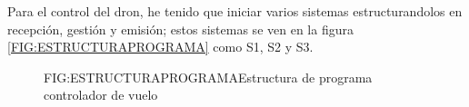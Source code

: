 
Para el control del dron, he tenido que iniciar varios sistemas estructurandolos en recepción, gestión y emisión; estos sistemas se ven en la figura \ref{FIG:ESTRUCTURAPROGRAMA} como S1, S2 y S3.

\begin{figure}[Estructura programa]{FIG:ESTRUCTURAPROGRAMA}{Estructura de programa controlador de vuelo}
\end{figure}















